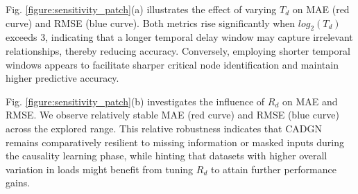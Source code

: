\documentclass[lettersize,journal]{IEEEtran}
\begin{document}

Fig. \ref{figure:sensitivity_patch}(a) illustrates the effect of varying $T_d$ on MAE (red curve) and RMSE (blue curve). Both metrics rise significantly when $log_2(T_d)$ exceeds 3, indicating that a longer temporal delay window may capture irrelevant relationships, thereby reducing accuracy. Conversely, employing shorter temporal windows appears to facilitate sharper critical node identification and maintain higher predictive accuracy.  


Fig. \ref{figure:sensitivity_patch}(b) investigates the influence of $R_d$ on MAE and RMSE. We observe relatively stable MAE (red curve) and RMSE (blue curve) across the explored range. This relative robustness indicates that CADGN remains comparatively resilient to missing information or masked inputs during the causality learning phase, while hinting that datasets with higher overall variation in loads might benefit from tuning  $ R_d $ to attain further performance gains. 

\end{document}
